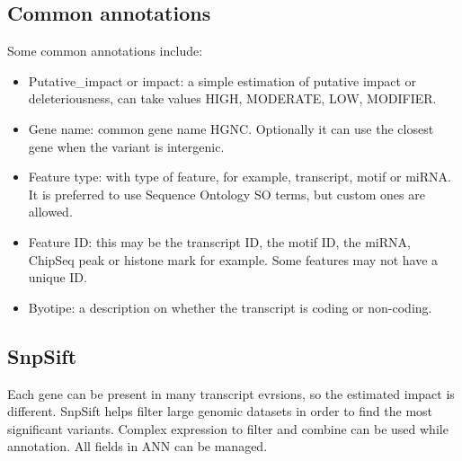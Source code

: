 	\subsection{Common annotations}
	Some common annotations include:

	\begin{multicols}{2}
		\begin{itemize}
			\item Putative\_impact or impact: a simple estimation of putative impact or deleteriousness, can take values HIGH, MODERATE, LOW, MODIFIER.
			\item Gene name: common gene name HGNC.
				Optionally it can use the closest gene when the variant is intergenic.
			\item Feature type: with type of feature, for example, transcript, motif or miRNA.
				It is preferred to use Sequence Ontology SO terms, but custom ones are allowed.
			\item Feature ID: this may be the transcript ID, the motif ID, the miRNA, ChipSeq peak or histone mark for example.
				Some features may not have a unique ID.
			\item Byotipe: a description on whether the transcript is coding or non-coding.
		\end{itemize}
	\end{multicols}

	\subsection{SnpSift}
	Each gene can be present in many transcript evrsions, so the estimated impact is different.
	SnpSift helps filter large genomic datasets in order to find the most significant variants.
	Complex expression to filter and combine can be used while annotation.
	All fields in ANN can be managed.
